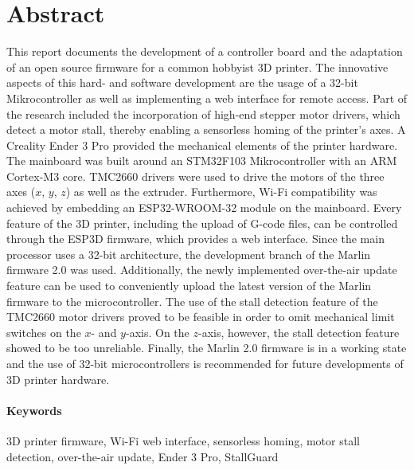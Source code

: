 \section*{Abstract}
\label{sec:Abstract}

This report documents the development of a controller board and the adaptation of an open source firmware for a common hobbyist 3D printer. The innovative aspects of this hard- and software development are the usage of a 32-bit Mikrocontroller as well as implementing a web interface for remote access. Part of the research included the incorporation of high-end stepper motor drivers, which detect a motor stall, thereby enabling a sensorless homing of the printer’s axes. A Creality Ender 3 Pro provided the mechanical elements of the printer hardware. The mainboard was built around an STM32F103 Mikrocontroller with an ARM Cortex-M3 core. TMC2660 drivers were used to drive the motors of the three axes ($x$, $y$, $z$) as well as the extruder. Furthermore, Wi-Fi compatibility was achieved by embedding an ESP32-WROOM-32 module on the mainboard. Every feature of the 3D printer, including the upload of G-code files, can be controlled through the ESP3D firmware, which provides a web interface. Since the main processor uses a 32-bit architecture, the development branch of the Marlin firmware 2.0 was used. Additionally, the newly implemented over-the-air update feature can be used to conveniently upload the latest version of the Marlin firmware to the microcontroller. The use of the stall detection feature of the TMC2660 motor drivers proved to be feasible in order to omit mechanical limit switches on the $x$- and $y$-axis. On the $z$-axis, however, the stall detection feature showed to be too unreliable. Finally, the Marlin 2.0 firmware is in a working state and the use of 32-bit microcontrollers is recommended for future developments of 3D printer hardware.

\paragraph{Keywords}
3D printer firmware, Wi-Fi web interface, sensorless homing, motor stall detection, over-the-air update, Ender 3 Pro, StallGuard
